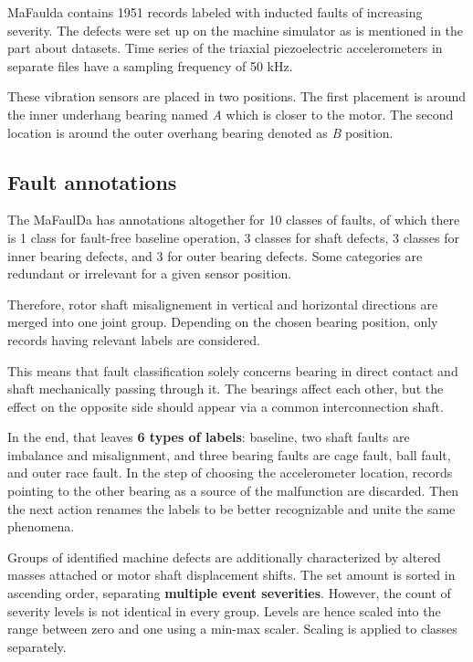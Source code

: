 
MaFaulda contains 1951 records labeled with inducted faults of increasing severity. The defects were set up on the machine simulator as is mentioned in the part about datasets. Time series of the triaxial piezoelectric accelerometers in separate files have a sampling frequency of 50 kHz. 

These vibration sensors are placed in two positions. The first placement is around the inner underhang bearing named \emph{A} which is closer to the motor. The second location is around the outer overhang bearing denoted as \emph{B} position.

\subsection{Fault annotations}
The MaFaulDa has annotations altogether for 10 classes of faults, of which there is 1 class for fault-free baseline operation, 3 classes for shaft defects, 3 classes for inner bearing defects, and 3 for outer bearing defects. Some categories are redundant or irrelevant for a given sensor position. 

Therefore, rotor shaft misalignement in vertical and horizontal directions are merged into one joint group. Depending on the chosen bearing position, only records having relevant labels are considered. 

This means that fault classification solely concerns bearing in direct contact and shaft mechanically passing through it. The bearings affect each other, but the effect on the opposite side should appear via a common interconnection shaft. 

In the end, that leaves \textbf{6 types of labels}: baseline, two shaft faults are imbalance and misalignment, and three bearing faults are cage fault, ball fault, and outer race fault. In the step of choosing the accelerometer location, records pointing to the other bearing as a source of the malfunction are discarded. Then the next action renames the labels to be better recognizable and unite the same phenomena.

Groups of identified machine defects are additionally characterized by altered masses attached or motor shaft displacement shifts. The set amount is sorted in ascending order, separating \textbf{multiple event severities}. However, the count of severity levels is not identical in every group. Levels are hence scaled into the range between zero and one using a min-max scaler. Scaling is applied to classes separately.

